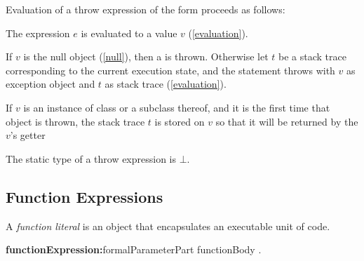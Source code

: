 \documentclass{article}
\begin{document}
\LMHash{}
Evaluation of a throw expression of the form  proceeds as follows:

\LMHash{}
The expression $e$ is evaluated to a value $v$ (\ref{evaluation}).


\LMHash{}
If $v$ is the null object (\ref{null}), then a  is thrown.
Otherwise let $t$ be a stack trace corresponding to the current execution state,
and the \THROW{} statement throws with $v$ as exception object
and $t$ as stack trace (\ref{evaluation}).

\LMHash{}
If $v$ is an instance of class  or a subclass thereof,
and it is the first time that  object is thrown,
the stack trace $t$ is stored on $v$ so that it will be returned
by the $v$'s  getter


\LMHash{}
The static type of a throw expression is $\bot$.


\subsection{Function Expressions}

\LMHash{}
A {\em function literal} is an object that encapsulates an executable unit of code.

\begin{grammar}
{\bf functionExpression:}formalParameterPart functionBody
  .
\end{grammar}

\end{document}
